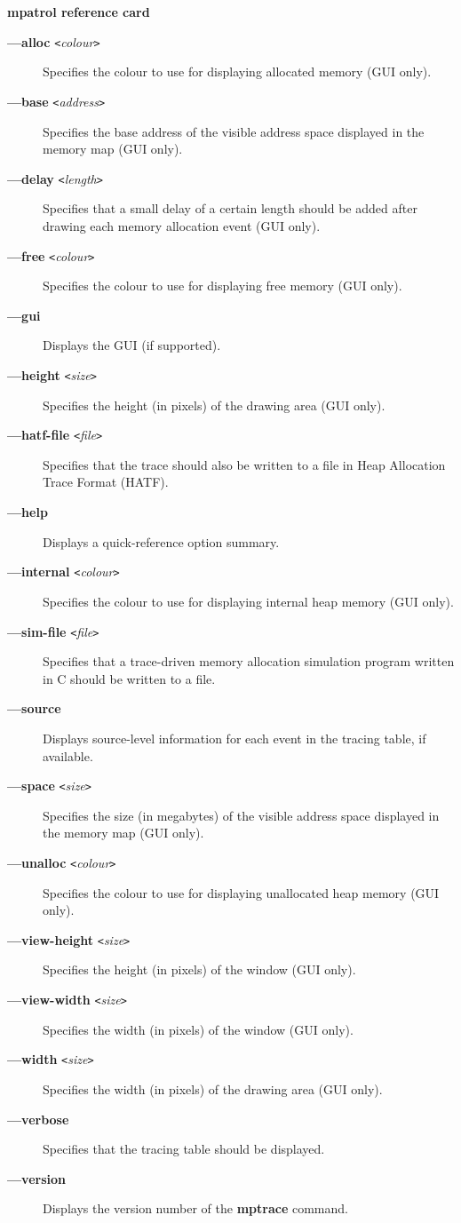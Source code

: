 \documentclass[a4paper,landscape,final]{article}
\newcommand{\command}[1]{\textbf{#1}}
\newcommand{\flag}[1]{\textbf{---#1}}
\newcommand{\flagpar}[2]{\flag{#1} \texttt{<}\textit{#2}\texttt{>}}
\begin{document}
\begin{multicols}{3}{\textbf{\Large mpatrol reference card}}
\begin{description}
\item[\flagpar{alloc}{colour}]
Specifies the colour to use for displaying allocated memory (GUI only).
\item[\flagpar{base}{address}]
Specifies the base address of the visible address space displayed in the memory
map (GUI only).
\item[\flagpar{delay}{length}]
Specifies that a small delay of a certain length should be added after drawing
each memory allocation event (GUI only).
\item[\flagpar{free}{colour}]
Specifies the colour to use for displaying free memory (GUI only).
\item[\flag{gui}]
Displays the GUI (if supported).
\item[\flagpar{height}{size}]
Specifies the height (in pixels) of the drawing area (GUI only).
\item[\flagpar{hatf-file}{file}]
Specifies that the trace should also be written to a file in Heap Allocation
Trace Format (HATF).
\item[\flag{help}]
Displays a quick-reference option summary.
\item[\flagpar{internal}{colour}]
Specifies the colour to use for displaying internal heap memory (GUI only).
\item[\flagpar{sim-file}{file}]
Specifies that a trace-driven memory allocation simulation program written in C
should be written to a file.
\item[\flag{source}]
Displays source-level information for each event in the tracing table, if
available.
\item[\flagpar{space}{size}]
Specifies the size (in megabytes) of the visible address space displayed in the
memory map (GUI only).
\item[\flagpar{unalloc}{colour}]
Specifies the colour to use for displaying unallocated heap memory (GUI only).
\item[\flagpar{view-height}{size}]
Specifies the height (in pixels) of the window (GUI only).
\item[\flagpar{view-width}{size}]
Specifies the width (in pixels) of the window (GUI only).
\item[\flagpar{width}{size}]
Specifies the width (in pixels) of the drawing area (GUI only).
\item[\flag{verbose}]
Specifies that the tracing table should be displayed.
\item[\flag{version}]
Displays the version number of the \command{mptrace} command.
\end{description}


\end{multicols}
\end{document}
